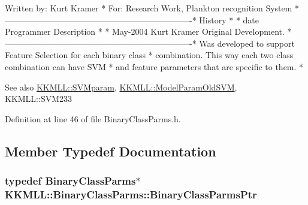 \begin{DoxyCode}
 Written by: Kurt Kramer                                           *
        For: Research Work, Plankton recognition System            *
-------------------------------------------------------------------*
  History                                                          *
                                                                   *
    date     Programmer   Description                              *
                                                                   *
  May-2004  Kurt Kramer  Original Development.                     *
-------------------------------------------------------------------*
 Was developed to support Feature Selection \textcolor{keywordflow}{for each} binary \textcolor{keyword}{class  }*
 combination.  This way each two \textcolor{keyword}{class }combination can have SVM    *
 and feature parameters that are specific to them.                 *
\end{DoxyCode}
 \begin{DoxySeeAlso}{See also}
\hyperlink{class_k_k_m_l_l_1_1_s_v_mparam}{K\+K\+M\+L\+L\+::\+S\+V\+Mparam}, \hyperlink{class_k_k_m_l_l_1_1_model_param_old_s_v_m}{K\+K\+M\+L\+L\+::\+Model\+Param\+Old\+S\+VM}, K\+K\+M\+L\+L\+::\+S\+V\+M233 
\end{DoxySeeAlso}


Definition at line 46 of file Binary\+Class\+Parms.\+h.



\subsection{Member Typedef Documentation}
\subsubsection[{\texorpdfstring{Binary\+Class\+Parms\+Ptr}{BinaryClassParmsPtr}}]{\setlength{\rightskip}{0pt plus 5cm}typedef {\bf Binary\+Class\+Parms}$\ast$ {\bf K\+K\+M\+L\+L\+::\+Binary\+Class\+Parms\+::\+Binary\+Class\+Parms\+Ptr}}\hypertarget{class_k_k_m_l_l_1_1_binary_class_parms_a97baab4d7e51018b31648a2f5a36a988}{}\label{class_k_k_m_l_l_1_1_binary_class_parms_a97baab4d7e51018b31648a2f5a36a988}



